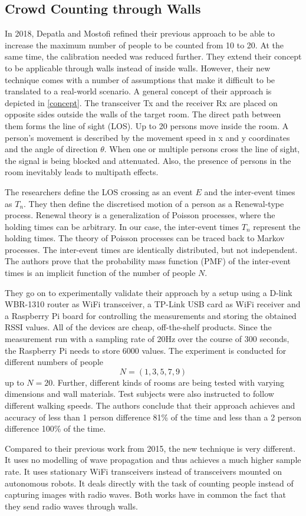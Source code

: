 \documentclass[conference]{IEEEtran}
\begin{document}
\subsection{Crowd Counting through Walls}
In 2018, Depatla and Mostofi \cite{DepatlaMostofi2018} refined their previous approach to be able to increase the maximum number of people to be counted from 10 to 20. At the same time, the calibration needed was reduced further. They extend their concept to be applicable through walls instead of inside walls. However, their new technique comes with a number of assumptions that make it difficult to be translated to a real-world scenario. A general concept of their approach is depicted in \ref{concept}. The transceiver Tx and the receiver Rx are placed on opposite sides outside the walls of the target room. The direct path between them forms the line of sight (LOS). Up to 20 persons move inside the room. A person's movement is described by the movement speed in x and y coordinates and the angle of direction $\theta$. When one or multiple persons cross the line of sight, the signal is being blocked and attenuated. Also, the presence of persons in the room inevitably leads to multipath effects.


The researchers define the LOS crossing as an event $E$ and the inter-event times as $T_n$. They then define the discretised motion of a person as a Renewal-type process. Renewal theory is a generalization of Poisson processes, where the holding times can be arbitrary. In our case, the inter-event times $T_n$ represent the holding times. The theory of Poisson processes can be traced back to Markov processes. The inter-event times are identically distributed, but not independent. The authors prove that the probability mass function (PMF) of the inter-event times is an implicit function of the number of people $N$.
\par
They go on to experimentally validate their approach by a setup using a D-link WBR-1310 router as WiFi transceiver, a TP-Link USB card as WiFi receiver and a Raspberry Pi board for controlling the measurements and storing the obtained RSSI values. All of the devices are cheap, off-the-shelf products. Since the measurement run with a sampling rate of 20Hz over the course of 300 seconds, the Raspberry Pi needs to store 6000 values. The experiment is conducted for different numbers of people $$N = (1, 3, 5, 7, 9)$$ up to $N=20$. Further, different kinds of rooms are being tested with varying dimensions and wall materials. Test subjects were also instructed to follow different walking speeds. The authors conclude that their approach achieves and accuracy of less than 1 person difference 81\% of the time and less than a 2 person difference 100\% of the time.
\par
Compared to their previous work from 2015, the new technique is very different. It uses no modelling of wave propagation and thus achieves a much higher sample rate. It uses stationary WiFi transceivers instead of transceivers mounted on autonomous robots. It deals directly with the task of counting people instead of capturing images with radio waves. Both works have in common the fact that they send radio waves through walls.
\end{document}
